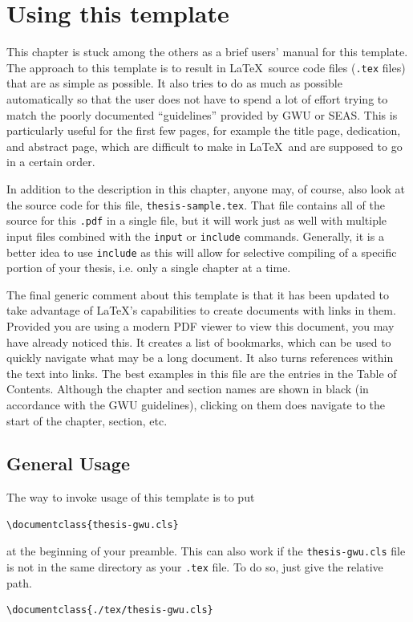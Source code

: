 
\chapter{Using this template} \label{chap:intro}

This chapter is stuck among the others as a brief users' manual for this template.  
The approach to this template is to result in \LaTeX~source code files (\texttt{.tex} files) that are as simple as possible.  
It also tries to do as much as possible automatically so that the user does not have to spend a lot of effort trying to match the poorly documented ``guidelines'' provided by GWU or SEAS. 
This is particularly useful for the first few pages, for example the title page, dedication, and abstract page, which are difficult to make in \LaTeX~and are supposed to go in a certain order.

In addition to the description in this chapter, anyone may, of course, also look at the source code for this file, \texttt{thesis-sample.tex}.
That file contains all of the source for this \texttt{.pdf} in a single file, but it will work just as well with multiple input files combined with the \texttt{input} or \texttt{include} commands.
Generally, it is a better idea to use \texttt{include} as this will allow for selective compiling of a specific portion of your thesis, i.e. only a single chapter at a time.

The final generic comment about this template is that it has been updated to take advantage of \LaTeX's capabilities to create documents with links in them.  
Provided you are using a modern PDF viewer to view this document, you may have already noticed this.  
It creates a list of bookmarks, which can be used to quickly navigate what may be a long document.  
It also turns references within the text into links.  
The best examples in this file are the entries in the Table of Contents.
Although the chapter and section names are shown in black (in accordance with the GWU guidelines), clicking on them does navigate to the start of the chapter, section, etc.


\section{General Usage}
The way to invoke usage of this template is to put
\begin{verbatim}
\documentclass{thesis-gwu.cls}
\end{verbatim}
at the beginning of your preamble.  
This can also work if the \texttt{thesis-gwu.cls} file is not in the same directory as your \texttt{.tex} file.  
To do so, just give the relative path.
\begin{verbatim}
\documentclass{./tex/thesis-gwu.cls}
\end{verbatim}

